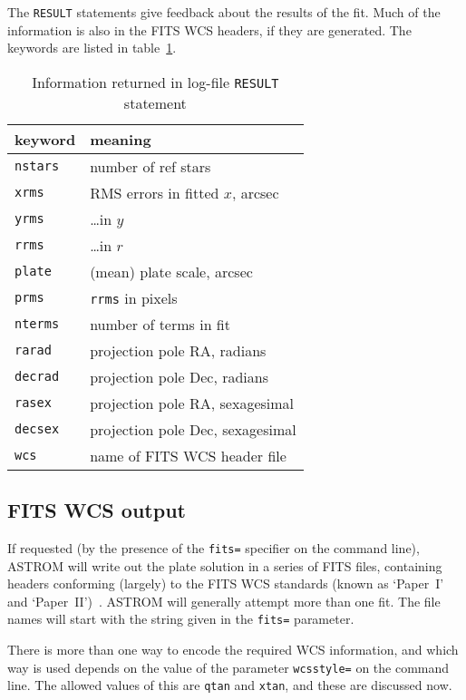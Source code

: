 \documentclass[twoside,11pt]{article}
\newcommand{\xlabel}[1]{}
\renewcommand{\_}{\texttt{\symbol{95}}}
\begin{document}
The \texttt{RESULT} statements give feedback about the results of the
fit.  Much of the information is also in the FITS WCS headers, if they
are generated.  The keywords are listed in table~\ref{t:result-table}.
\begin{table}
\begin{center}
\begin{tabular}{|l|l|}
\hline
\textbf{keyword} & \textbf{meaning} \\
\hline
\texttt{nstars} & number of ref stars \\
\texttt{xrms} & RMS errors in fitted $x$, arcsec \\
\texttt{yrms} & \dots in $y$ \\
\texttt{rrms} & \dots in $r$ \\
\texttt{plate} & (mean) plate scale, arcsec \\
\texttt{prms} & \texttt{rrms} in pixels \\
\texttt{nterms} & number of terms in fit \\
\texttt{rarad} & projection pole RA, radians \\
\texttt{decrad} & projection pole Dec, radians \\
\texttt{rasex} & projection pole RA, sexagesimal \\
\texttt{decsex} & projection pole Dec, sexagesimal \\
\texttt{wcs} & name of FITS WCS header file \\
\hline
\end{tabular}
\end{center}
\caption{\label{t:result-table}Information returned in log-file
\texttt{RESULT} statement}
\end{table}

\subsection{\xlabel{output_wcs}FITS WCS output}
\label{output_wcs}

If requested (by the presence of the \texttt{fits=} specifier on the
command line), ASTROM will write out the plate solution in a series of
FITS files, containing headers conforming (largely) to the FITS WCS
standards (known as `Paper~I' and
`Paper~II')~\cite{fitswcs1,fitswcs2}.  ASTROM will generally attempt
more than one fit.  The file names will start with the string given in
the \texttt{fits=} parameter.

There is more than one way to encode the required WCS information, and
which way is used depends on the value of the parameter
\texttt{wcsstyle=} on the command line.  The allowed values of this
are \texttt{qtan} and \texttt{xtan}, and these are discussed now.
\end{document}
